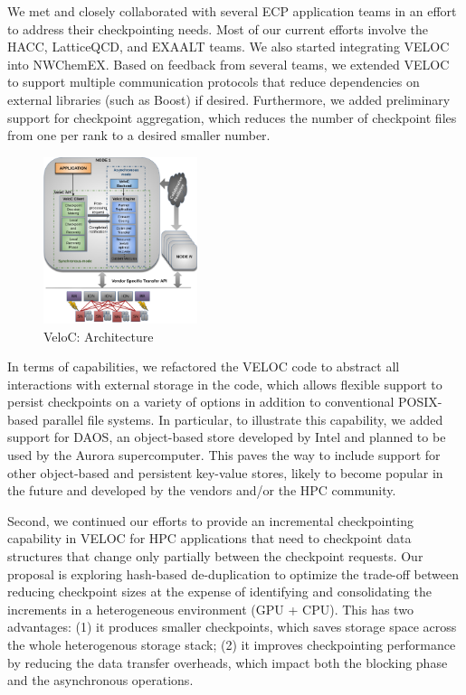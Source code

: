 We met and closely collaborated with several ECP application teams in
an effort to address their checkpointing needs. Most of our current
efforts involve the HACC, LatticeQCD, and EXAALT teams. We also
started integrating VELOC into NWChemEX. Based on feedback from
several teams, we extended VELOC to support multiple communication
protocols that reduce dependencies on external libraries (such as
Boost) if desired.  Furthermore, we added preliminary support for
checkpoint aggregation, which reduces the number of checkpoint files
from one per rank to a desired smaller number.

\begin{figure}
  \includegraphics[width=0.4\textwidth]{projects/2.3.4-DataViz/2.3.4.14-VeloC-SZ/veloc-arch}
  \caption{VeloC: Architecture}%
  \label{fig:veloc:arch}%
\end{figure}

In terms of capabilities, we refactored the VELOC code to abstract all
interactions with external storage in the code, which allows flexible
support to persist checkpoints on a variety of options in addition to
conventional POSIX-based parallel file systems. In particular, to
illustrate this capability, we added support for DAOS, an object-based
store developed by Intel and planned to be used by the Aurora
supercomputer. This paves the way to include support for other
object-based and persistent key-value stores, likely to become popular
in the future and developed by the vendors and/or the HPC community.

Second, we continued our efforts to provide an incremental
checkpointing capability in VELOC for HPC applications that need to
checkpoint data structures that change only partially between the
checkpoint requests.  Our proposal is exploring hash-based
de-duplication to optimize the trade-off between reducing checkpoint
sizes at the expense of identifying and consolidating the increments
in a heterogeneous environment (GPU + CPU).  This has two advantages:
(1) it produces smaller checkpoints, which saves storage space across
the whole heterogenous storage stack; (2) it improves checkpointing
performance by reducing the data transfer overheads, which impact both
the blocking phase and the asynchronous operations.


